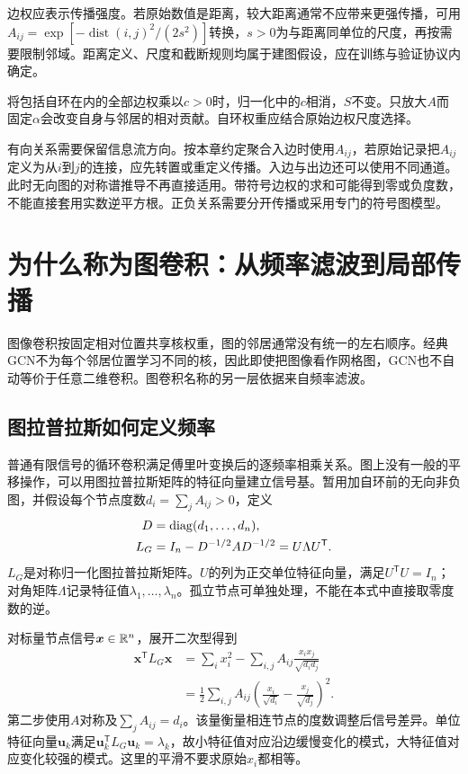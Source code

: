 边权应表示传播强度。若原始数值是距离，较大距离通常不应带来更强传播，可用$A_{ij}=\exp[-\operatorname{dist}(i,j)^2/(2s^2)]$转换，$s>0$为与距离同单位的尺度，再按需要限制邻域。距离定义、尺度和截断规则均属于建图假设，应在训练与验证协议内确定。

将包括自环在内的全部边权乘以$c>0$时，归一化中的$c$相消，$S$不变。只放大$A$而固定$\alpha$会改变自身与邻居的相对贡献。自环权重应结合原始边权尺度选择。

有向关系需要保留信息流方向。按本章约定聚合入边时使用$A_{ij}$，若原始记录把$A_{ij}$定义为从$i$到$j$的连接，应先转置或重定义传播。入边与出边还可以使用不同通道。此时无向图的对称谱推导不再直接适用。带符号边权的求和可能得到零或负度数，不能直接套用实数逆平方根。正负关系需要分开传播或采用专门的符号图模型。

\section{为什么称为图卷积：从频率滤波到局部传播}
图像卷积按固定相对位置共享核权重，图的邻居通常没有统一的左右顺序。经典GCN不为每个邻居位置学习不同的核，因此即使把图像看作网格图，GCN也不自动等价于任意二维卷积。图卷积名称的另一层依据来自频率滤波。

\subsection{图拉普拉斯如何定义频率}
普通有限信号的循环卷积满足傅里叶变换后的逐频率相乘关系。图上没有一般的平移操作，可以用图拉普拉斯矩阵的特征向量建立信号基。暂用加自环前的无向非负图，并假设每个节点度数$d_i=\sum_jA_{ij}>0$，定义
\begin{equation}
 \begin{aligned}
 D&=\operatorname{diag}(d_1,\ldots,d_n),\\
 L_G&=I_n-D^{-1/2}AD^{-1/2}=U\Lambda U^{\mathsf T}.
 \end{aligned}
 \label{eq:graph-laplacian}
\end{equation}
$L_G$是对称归一化图拉普拉斯矩阵。$U$的列为正交单位特征向量，满足$U^{\mathsf T}U=I_n$；对角矩阵$\Lambda$记录特征值$\lambda_1,\ldots,\lambda_n$。孤立节点可单独处理，不能在本式中直接取零度数的逆。

对标量节点信号$\bm x\in\mathbb{R}^n$，展开二次型得到
\begin{align}
 \bm x^{\mathsf T}L_G\bm x
 &=\sum_i x_i^2-\sum_{i,j}A_{ij}\frac{x_ix_j}{\sqrt{d_id_j}}\\
 &=\frac12\sum_{i,j}A_{ij}\left(\frac{x_i}{\sqrt{d_i}}-\frac{x_j}{\sqrt{d_j}}\right)^2.
 \label{eq:graph-smoothness}
\end{align}
第二步使用$A$对称及$\sum_jA_{ij}=d_i$。该量衡量相连节点的度数调整后信号差异。单位特征向量$\bm u_k$满足$\bm u_k^{\mathsf T}L_G\bm u_k=\lambda_k$，故小特征值对应沿边缓慢变化的模式，大特征值对应变化较强的模式。这里的平滑不要求原始$x_i$都相等。

